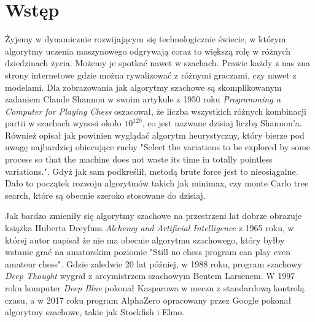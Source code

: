 \section*{Wstęp}

Żyjemy w dynamicznie rozwijającym się technologicznie świecie, w którym algorytmy uczenia maszynowego odgrywają coraz to większą rolę w różnych dziedzinach życia. Możemy je spotkać nawet w szachach. Prawie każdy z nas zna strony internetowe gdzie można rywalizować z różnymi graczami, czy nawet z modelami. Dla zobrazowania jak algorytmy szachowe są skomplikowanym zadaniem Claude Shannon w swoim artykule z 1950 roku \textit{Programming a Computer for Playing Chess} oszacował, że liczba wszystkich różnych kombinacji partii w szachach wynosi około $10^{120}$, co jest nazwane dzisiaj liczbą Shannon'a. Również opisał jak powinien wyglądać algorytm heurystyczny, który bierze pod uwagę najbardziej obiecujące ruchy "Select the variations to be explored by some process so that the machine does not waste its time in totally pointless variations.". Gdyż jak sam podkreślił, metodą brute force jest to nieosiągalne. Dało to początek rozwoju algorytmów takich jak minimax, czy monte Carlo tree search, które są obecnie szeroko stosowane do dzisiaj.

Jak bardzo zmieniły się algorytmy szachowe na przestrzeni lat dobrze obrazuje książka Huberta Dreyfusa \textit{Alchemy and Artificial Intelligence} z 1965 roku, w której autor napisał że nie ma obecnie algorytmu szachowego, który byłby wstanie grać na amatorskim poziomie "Still no chess program can play even amateur chess". Gdzie zaledwie 20 lat później, w 1988 roku, program szachowy \textit{Deep Thought} wygrał z arcymistrzem szachowym Bentem Larsenem. W 1997 roku komputer \textit{Deep Blue} pokonał Kasparowa w meczu z standardową kontrolą czasu, a w 2017 roku program AlphaZero opracowany przez Google pokonał algorytmy szachowe, takie jak Stockfish i Elmo.